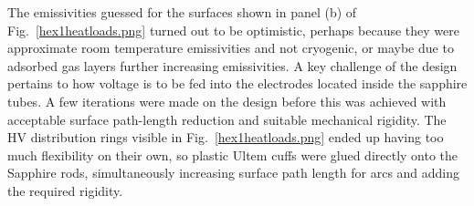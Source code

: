 
The emissivities guessed for the surfaces shown in panel (b) of Fig.~\ref{hex1heatloads.png} turned out to be optimistic, perhaps because they were approximate room temperature emissivities and not cryogenic, or maybe due to adsorbed gas layers further increasing emissivities.
A key challenge of the design pertains to how voltage is to be fed into the electrodes located inside the sapphire tubes.
A few iterations were made on the design before this was achieved with acceptable surface path-length reduction and suitable mechanical rigidity.
The HV distribution rings visible in Fig.~\ref{hex1heatloads.png} ended up having too much flexibility on their own, so plastic Ultem cuffs were glued directly onto the Sapphire rods, simultaneously increasing surface path length for arcs and adding the required rigidity.


